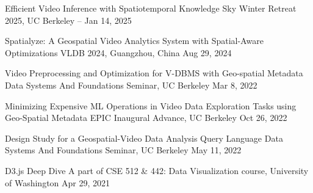 

\begin{cvpubs}

  \cvpub
    {Efficient Video Inference with Spatiotemporal Knowledge} %
    {Sky Winter Retreat 2025, UC Berkeley -- \href{https://youtu.be/FaE254pkr1c}{\underline{}}} %
    {Jan 14, 2025} %
    {} %

  \cvpub
    {Spatialyze: A Geospatial Video Analytics System with Spatial-Aware Optimizations} %
    {VLDB 2024, Guangzhou, China} %
    {Aug 29, 2024} %
    {} %


  \cvpub
    {Video Preprocessing and Optimization for V-DBMS with Geo-spatial Metadata} %
    {Data Systems And Foundations Seminar, UC Berkeley} %
    {Mar 8, 2022} %
    {} %

  \cvpub
    {Minimizing Expensive ML Operations in Video Data Exploration Tasks using Geo-Spatial Metadata} %
    {EPIC Inaugural Advance, UC Berkeley} %
    {Oct 26, 2022} %
    {} %

  \cvpub
    {Design Study for a Geospatial-Video Data Analysis Query Language} %
    {Data Systems And Foundations Seminar, UC Berkeley} %
    {May 11, 2022} %
    {} %

  \cvpub
    {D3.js Deep Dive} %
    {A part of CSE 512 \& 442: Data Visualization course, University of Washington} %
    {Apr 29, 2021} %
    {} %
    

\end{cvpubs}
